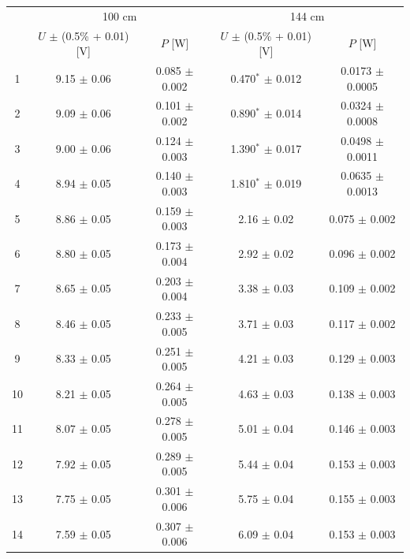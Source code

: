 \documentclass[a4paper]{article}
\begin{document}
\begin{table}[H]
	\centering
	\begin{tabular}{c||cc|cc}
		\hline
		   & \multicolumn{2}{c|}{100 cm}  & \multicolumn{2}{c}{144 cm}                                                       \\
		   & $U$ $\pm$ (0.5\% + 0.01) [V] & $P$ [W]                    & $U$ $\pm$ (0.5\% + 0.01) [V] & $P$ [W]              \\
		\hline
		1  & 9.15  $\pm$ 0.06             & 0.085  $\pm$ 0.002         & 0.470$^*$   $\pm$ 0.012      & 0.0173  $\pm$ 0.0005 \\
		2  & 9.09  $\pm$ 0.06             & 0.101  $\pm$ 0.002         & 0.890$^*$   $\pm$ 0.014      & 0.0324  $\pm$ 0.0008 \\
		3  & 9.00  $\pm$ 0.06             & 0.124  $\pm$ 0.003         & 1.390$^*$   $\pm$ 0.017      & 0.0498  $\pm$ 0.0011 \\
		4  & 8.94  $\pm$ 0.05             & 0.140  $\pm$ 0.003         & 1.810$^*$   $\pm$ 0.019      & 0.0635  $\pm$ 0.0013 \\
		5  & 8.86  $\pm$ 0.05             & 0.159  $\pm$ 0.003         & 2.16   $\pm$ 0.02            & 0.075   $\pm$ 0.002  \\
		6  & 8.80  $\pm$ 0.05             & 0.173  $\pm$ 0.004         & 2.92   $\pm$ 0.02            & 0.096   $\pm$ 0.002  \\
		7  & 8.65  $\pm$ 0.05             & 0.203  $\pm$ 0.004         & 3.38   $\pm$ 0.03            & 0.109   $\pm$ 0.002  \\
		8  & 8.46  $\pm$ 0.05             & 0.233  $\pm$ 0.005         & 3.71   $\pm$ 0.03            & 0.117   $\pm$ 0.002  \\
		9  & 8.33  $\pm$ 0.05             & 0.251  $\pm$ 0.005         & 4.21   $\pm$ 0.03            & 0.129   $\pm$ 0.003  \\
		10 & 8.21  $\pm$ 0.05             & 0.264  $\pm$ 0.005         & 4.63   $\pm$ 0.03            & 0.138   $\pm$ 0.003  \\
		11 & 8.07  $\pm$ 0.05             & 0.278  $\pm$ 0.005         & 5.01   $\pm$ 0.04            & 0.146   $\pm$ 0.003  \\
		12 & 7.92  $\pm$ 0.05             & 0.289  $\pm$ 0.005         & 5.44   $\pm$ 0.04            & 0.153   $\pm$ 0.003  \\
		13 & 7.75  $\pm$ 0.05             & 0.301  $\pm$ 0.006         & 5.75   $\pm$ 0.04            & 0.155   $\pm$ 0.003  \\
		14 & 7.59  $\pm$ 0.05             & 0.307  $\pm$ 0.006         & 6.09   $\pm$ 0.04            & 0.153   $\pm$ 0.003  \\

\end{tabular}
\end{table}
\end{document}

